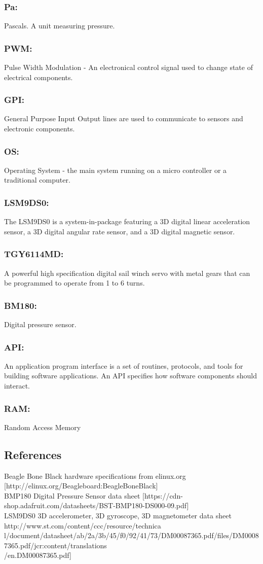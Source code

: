 \documentclass[10pt,draftclsnofoot,onecolumn,compsoc]{IEEEtran}
\begin{document}
\subsubsection{\bf Pa:} Pascals. A unit measuring pressure.
\subsubsection{\bf PWM:} Pulse Width Modulation - An electronical control signal used to change state of electrical components.
\subsubsection{\bf GPI:}  General Purpose Input Output lines are used to communicate to sensors and electronic components.
\subsubsection{\bf OS:} Operating System - the main system running on a micro controller or a traditional computer.
\subsubsection{\bf LSM9DS0:} The LSM9DS0 is a system-in-package featuring a 3D digital linear acceleration sensor,  a 3D digital angular rate sensor, and a 3D digital magnetic sensor.
\subsubsection{\bf TGY6114MD:}A powerful high specification digital sail winch servo with metal gears that can be programmed to operate from 1 to 6 turns.
\subsubsection{\bf BM180:}Digital pressure sensor.
\subsubsection{\bf API:}An application program interface is a set of routines, protocols, and tools for building software applications. An API specifies how software components should interact.
\subsubsection{\bf RAM:}Random Access Memory

\subsection{ References}
Beagle Bone Black hardware specifications from elinux.org [http://elinux.org/Beagleboard:BeagleBoneBlack]\\
BMP180 Digital Pressure Sensor data sheet [https://cdn-shop.adafruit.com/datasheets/BST-BMP180-DS000-09.pdf]\\
LSM9DS0 3D accelerometer, 3D gyroscope, 3D magnetometer data sheet http://www.st.com/content/ccc/resource/technica\\l/document/datasheet/ab/2a/3b/45/f0/92/41/73/DM00087365.pdf/files/DM00087365.pdf/jcr:content/translations\\/en.DM00087365.pdf]
\end{document}
